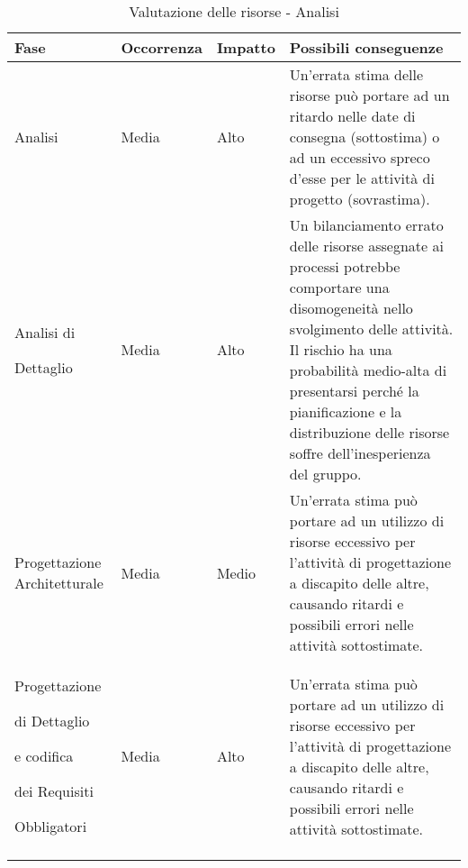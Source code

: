 \documentclass[../PianoProgetto.tex]{subfiles}
\begin{document}
	\hspace{0pt}
		\begin{longtabu} to \textwidth {X[.55] X[c .50] X[c .50] X}
			\toprule
			\textbf{Fase} & \textbf{Occorrenza} & \textbf{Impatto} & \textbf{Possibili conseguenze}\\
			\midrule
			\endhead
			
			Analisi & Media & Alto & Un'errata stima delle risorse può portare ad un ritardo nelle date di consegna (sottostima) o ad un eccessivo spreco d'esse per le attività di progetto (sovrastima). \\
			\midrule
			Analisi di \par Dettaglio & Media & Alto & Un bilanciamento errato delle risorse assegnate ai processi potrebbe comportare una disomogeneità nello svolgimento delle attività. Il rischio ha una probabilità medio-alta di presentarsi perché la pianificazione e la distribuzione delle risorse soffre dell'inesperienza del gruppo. \\
			\midrule
			Progettazione Architetturale & Media & Medio & Un'errata stima può portare ad un utilizzo di risorse eccessivo per l'attività di progettazione a discapito delle altre, causando ritardi e possibili errori nelle attività sottostimate. \\
			\midrule
			Progettazione \par di Dettaglio \par e codifica \par dei Requisiti \par Obbligatori & Media & Alto & Un'errata stima può portare ad un utilizzo di risorse eccessivo per l'attività di progettazione a discapito delle altre, causando ritardi e possibili errori nelle attività sottostimate.\\
			\bottomrule

		\caption{Valutazione delle risorse - Analisi}
		\label{tab:Valutazione delle risorse - Analisi}	
	\end{longtabu}
	
\end{document}
